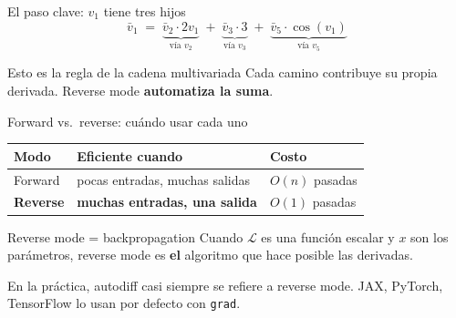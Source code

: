 \documentclass[aspectratio=169,10pt]{beamer}
\begin{document}
\begin{frame}{El paso clave: $v_1$ tiene tres hijos}
\[
\bar{v}_1 \;=\; \underbrace{\bar{v}_2 \cdot 2 v_1}_{\text{vía } v_2} \;+\; \underbrace{\bar{v}_3 \cdot 3}_{\text{vía } v_3} \;+\; \underbrace{\bar{v}_5 \cdot \cos(v_1)}_{\text{vía } v_5}
\]

\vspace{8pt}
\begin{center}
\end{center}

\vspace{6pt}
\begin{resultbox}{Esto es la regla de la cadena multivariada}
Cada camino contribuye su propia derivada. Reverse mode \textbf{automatiza la suma}.
\end{resultbox}
\end{frame}

\begin{frame}{Forward vs.\ reverse: cuándo usar cada uno}
\vspace{6pt}
\begin{center}
\begin{tabular}{lll}
\toprule
\textbf{Modo} & \textbf{Eficiente cuando} & \textbf{Costo} \\
\midrule
Forward  & pocas entradas, muchas salidas & $O(n)$ pasadas \\
\rowcolor{accentteal!12}
\textbf{Reverse} & \textbf{muchas entradas, una salida} & $O(1)$ pasadas \\
\bottomrule
\end{tabular}
\end{center}

\vspace{12pt}
\begin{defbox}{Reverse mode = backpropagation}
Cuando $\mathcal{L}$ es una función  escalar y $x$ son los parámetros, reverse mode es \textbf{el} algoritmo que hace posible las derivadas.
\end{defbox}

\vspace{8pt}
\textcolor{textgray}{En la práctica, autodiff casi siempre se refiere a reverse mode. JAX, PyTorch, TensorFlow lo usan por defecto con \texttt{grad}.}
\end{frame}
\end{document}
